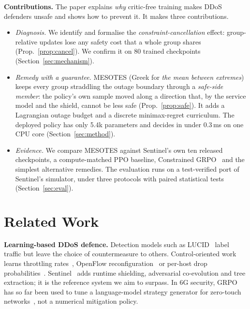 \documentclass[conference]{IEEEtran}
\begin{document}
\textbf{Contributions.} The paper explains \emph{why} critic-free training makes DDoS defenders unsafe and shows how to prevent it. It makes three contributions.
\begin{itemize}
\item \emph{Diagnosis.} We identify and formalise the \emph{constraint-cancellation} effect: group-relative updates lose any safety cost that a whole group shares (Prop.~\ref{prop:cancel}). We confirm it on 80 trained checkpoints (Section~\ref{sec:mechanism}).
\item \emph{Remedy with a guarantee.} MESOTES (Greek for \emph{the mean between extremes}) keeps every group straddling the outage boundary through a \emph{safe-side member}: the policy's own sample moved along a direction that, by the service model and the shield, cannot be less safe (Prop.~\ref{prop:safe}). It adds a Lagrangian outage budget and a discrete minimax-regret curriculum. The deployed policy has only 5.4k parameters and decides in under 0.3\,ms on one CPU core (Section~\ref{sec:method}).
\item \emph{Evidence.} We compare MESOTES against Sentinel's own ten released checkpoints, a compute-matched PPO baseline, Constrained GRPO~\cite{girgis2026cgrpo} and the simplest alternative remedies. The evaluation runs on a test-verified port of Sentinel's simulator, under three protocols with paired statistical tests (Section~\ref{sec:eval}).
\end{itemize}

\section{Related Work}
\textbf{Learning-based DDoS defence.} Detection models such as LUCID~\cite{doriguzzi2020lucid} label traffic but leave the choice of countermeasure to others. Control-oriented work learns throttling rates~\cite{malialis2015distributed}, OpenFlow reconfiguration~\cite{liu2018drlddos,akbari2020atmos} or per-host drop probabilities~\cite{simpson2020perhost}. Sentinel~\cite{alfatemi2026sentinel} adds runtime shielding, adversarial co-evolution and tree extraction; it is the reference system we aim to surpass. In 6G security, GRPO has so far been used to tune a language-model strategy generator for zero-touch networks~\cite{cao2025secloop}, not a numerical mitigation policy.
\end{document}
